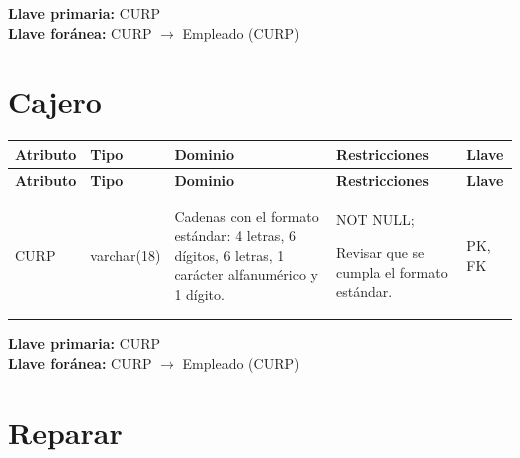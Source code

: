 \documentclass[12pt]{article}
\begin{document}
\vspace{2pt}
\textbf{Llave primaria:} CURP\\
\textbf{Llave foránea:} CURP $\rightarrow$ Empleado (CURP)\\


\section*{Cajero}

\begin{longtable}{p{3.2cm} p{2.2cm} p{4.8cm} p{4.2cm} p{1.2cm}}
\label{tab:cajero}\\
\toprule
\textbf{Atributo} & \textbf{Tipo} & \textbf{Dominio} & \textbf{Restricciones} & \textbf{Llave} \\
\midrule
\endfirsthead

\toprule
\textbf{Atributo} & \textbf{Tipo} & \textbf{Dominio} & \textbf{Restricciones} & \textbf{Llave} \\
\midrule
\endhead

\bottomrule
\endfoot

CURP 
& varchar(18) 
& Cadenas con el formato estándar: 4 letras, 6 dígitos, 6 letras, 1 carácter alfanumérico y 1 dígito.
& NOT NULL; 

Revisar que se cumpla
el formato estándar.
& PK, FK \\

\end{longtable}

\vspace{2pt}
\textbf{Llave primaria:} CURP\\
\textbf{Llave foránea:} CURP $\rightarrow$ Empleado (CURP)\\



\section*{Reparar}
\end{document}
